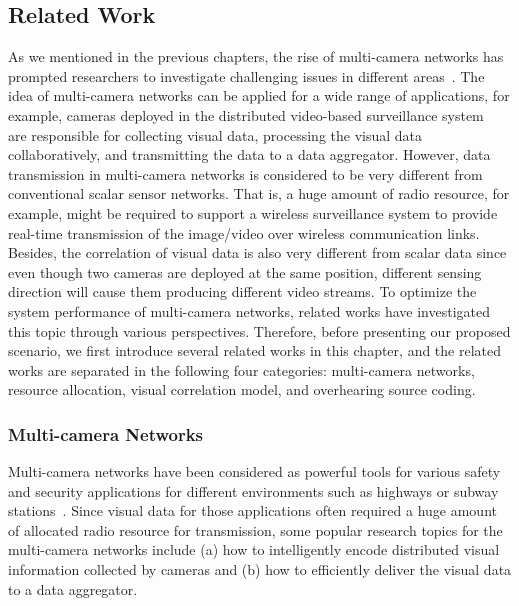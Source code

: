 \subsection{Related Work}
\label{sec::relatedWork}
As we mentioned in the previous chapters, the rise of multi-camera networks has prompted researchers to investigate challenging issues in different areas~\cite{VsnChallenges}.
The idea of multi-camera networks can be applied for a wide range of applications, for example, cameras deployed in the distributed video-based surveillance system~\cite{VideoBasedSurveillanceSystem} are responsible for collecting visual data, processing the visual data collaboratively, and transmitting the data to a data aggregator.
However, data transmission in multi-camera networks is considered to be very different from conventional scalar sensor networks.
That is, a huge amount of radio resource, for example, might be required to support a wireless surveillance system to provide real-time transmission of the image/video over wireless communication links.
Besides, the correlation of visual data is also very different from scalar data since even though two cameras are deployed at the same position, different sensing direction will cause them producing different video streams.
To optimize the system performance of multi-camera networks, related works have investigated this topic through various perspectives.
Therefore, before presenting our proposed scenario, we first introduce several related works in this chapter, and the related works are separated in the following four categories: multi-camera networks, resource allocation, visual correlation model, and overhearing source coding.
%
\subsubsection{Multi-camera Networks}
Multi-camera networks have been considered as powerful tools for various safety and security applications for different environments such as highways or subway stations~\cite{MultiCameraNetworksBook}.
Since visual data for those applications often required a huge amount of allocated radio resource for transmission, some popular research topics for the multi-camera networks include (a) how to intelligently encode distributed visual information collected by cameras and (b) how to efficiently deliver the visual data to a data aggregator.

